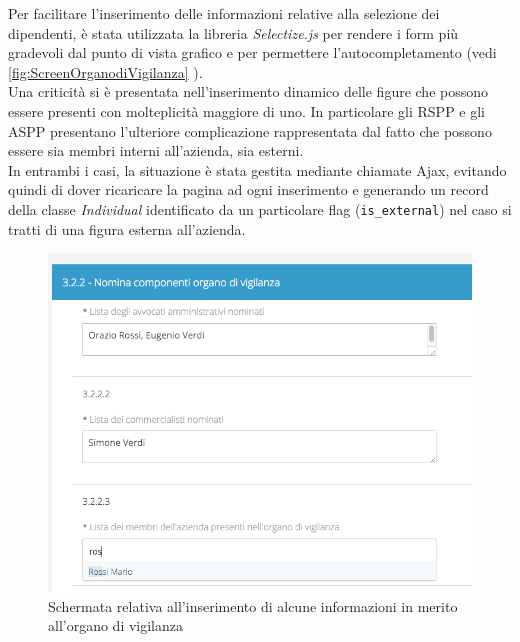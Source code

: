 	Per facilitare l'inserimento delle informazioni relative alla selezione dei dipendenti, è stata utilizzata la libreria \textit{Selectize.js} per rendere i form più gradevoli dal punto di vista grafico e per permettere l'autocompletamento (vedi \autoref{fig:ScreenOrganodiVigilanza} ). \\ 
	Una criticità si è presentata nell'inserimento dinamico delle figure che possono essere presenti con molteplicità maggiore di uno. In particolare gli RSPP e gli ASPP presentano l'ulteriore complicazione rappresentata dal fatto che possono essere sia membri interni all'azienda, sia esterni. \\
	In entrambi i casi, la situazione è stata gestita mediante chiamate \gls{Ajax}, evitando quindi di dover ricaricare la pagina ad ogni inserimento e generando un record della classe \textit{Individual}  identificato da un particolare flag (\texttt{is\_external}) nel caso si tratti di una figura esterna all'azienda.\\
	
	\begin{figure}[H]
		\begin{center}
			\includegraphics[width=12cm]{Pics/screen_organo_di_vigianza_con_autocompletamento.png}
			\caption{
				Schermata relativa all'inserimento di alcune informazioni in merito all'organo di vigilanza}
			\label{fig:ScreenOrganodiVigilanza}
		\end{center}
	\end{figure}
	
